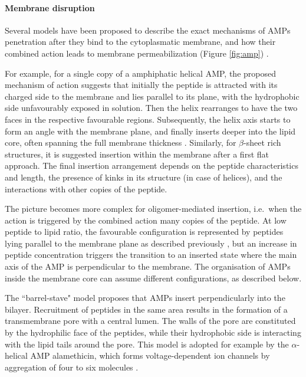 \paragraph{Membrane disruption} Several models have been proposed to describe the exact mechanisms of AMPs penetration after they bind to the cytoplasmatic membrane, and how their combined action leads to membrane permeabilization (Figure \ref{fig:amp}) \cite{Brogden2005,Toke2005,Nguyen2011}.

For example, for a single copy of a amphiphatic helical AMP, the proposed mechanism of action suggests that initially the peptide is attracted with its charged side to the membrane and lies parallel to its plane, with the hydrophobic side unfavourably exposed in solution. Then the helix rearranges to have the two faces in the respective favourable regions. Subsequently, the helix axis starts to form an angle with the membrane plane, and finally inserts deeper into the lipid core, often spanning the full membrane thickness \cite{Ebenhan2014}.
%
Similarly, for $\beta$-sheet rich structures, it is suggested insertion within the membrane after a first flat approach.
%
The final insertion arrangement depends on the peptide characteristics and length, the presence of kinks in its structure (in case of helices), and the interactions with other copies of the peptide.

The picture becomes more complex for oligomer-mediated insertion, i.e.\ when the action is triggered by the combined action many copies of the peptide.
%
At low peptide to lipid ratio, the favourable configuration is represented by peptides lying parallel to the membrane plane as described previously \cite{Yang2001}, but an increase in peptide concentration triggers the transition to an inserted state where the main axis of the AMP is perpendicular to the membrane. The organisation of AMPs inside the membrane core can assume different configurations, as described below.

The ``barrel-stave" model proposes that AMPs insert perpendicularly into the bilayer. Recruitment of peptides in the same area results in the formation of a transmembrane pore with a central lumen. The walls of the pore are constituted by the hydrophilic face of the peptides, while their hydrophobic side is interacting with the lipid tails around the pore. This model is adopted for example by the $\alpha$-helical AMP alamethicin, which forms voltage-dependent ion channels by aggregation of four to six molecules \cite{Bertelsen2012,Yang2001,Lee2004,Spaar2004}.

